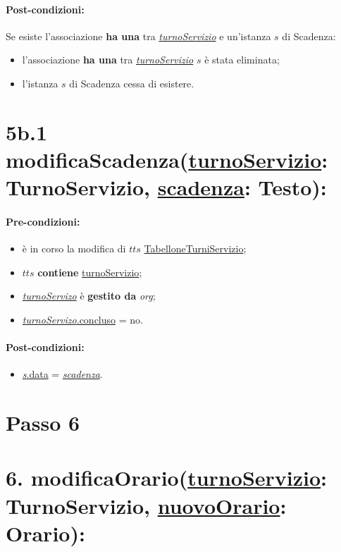\paragraph{Post-condizioni:} Se esiste l'associazione \textbf{ha una} tra \underline{\textit{turnoServizio}} e un'istanza $s$ di Scadenza:

\begin{itemize}
\item l'associazione \textbf{ha una} tra \underline{\textit{turnoServizio}} $s$ è stata eliminata;
 \item l'istanza $s$ di Scadenza cessa di esistere.
\end{itemize}

\section*{5b.1 modificaScadenza(\underline{turnoServizio}: TurnoServizio, \underline{scadenza}: Testo):}

\paragraph{Pre-condizioni:}
\begin{itemize}
\item è in corso la modifica di $tts$ \underline{TabelloneTurniServizio};
 \item $tts$ \textbf{contiene} \underline{turnoServizio};
 \item \underline{\textit{turnoServizo}} è \textbf{gestito da} {\textit{org}};
 \item \underline{\textit{turnoServizo}.concluso} = no.
\end{itemize}

\paragraph{Post-condizioni:}
\begin{itemize}
    \item \underline{\textit{s}.data} = \underline{\textit{scadenza}}.
\end{itemize}

\section{Passo 6}
\section*{6. modificaOrario(\underline{turnoServizio}: TurnoServizio, \underline{nuovoOrario}: Orario):}

